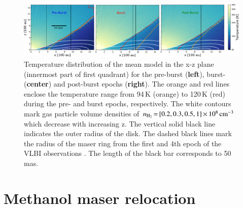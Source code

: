 


\begin{figure}
\centering
	\includegraphics[width=\textwidth]{G358_XZ-T3wb.png}
\caption{Temperature distribution
of the mean model in the x-z plane (innermost part of first quadrant) for the pre-burst ({\bf left}), burst- ({\bf center}) and post-burst epochs ({\bf right}).  The orange and red lines enclose the temperature range from 94\,K (orange) to 120\,K (red) during the pre- and burst epochs, respectively. The white contours mark gas particle volume densities of %
$n_{\rm H_2}\,{=}\,[0.2,0.3,0.5,1]\,{\times}\,10^{8}\,\rm cm^{-3}$ which decrease with increasing z. The vertical solid black line indicates the outer radius of the disk. The dashed black lines mark the radius of the maser ring from the first and 4th epoch of the VLBI observations \citep[Burns et al., in prep.;]{2020NatAs...4..506B}. The length of the black bar corresponds to 50\,mas.
	}
 \label{fig: T, rho}
\end{figure}


\section{Methanol maser relocation}


